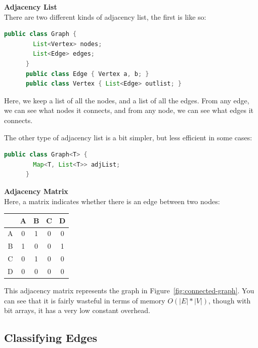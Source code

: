 \begin{description}
  \item \textbf{Adjacency List}\\
    There are two different kinds of adjacency list, the first is like so:

    \begin{lstlisting}[language=java]
      public class Graph {
        List<Vertex> nodes;
        List<Edge> edges;
      }
      public class Edge { Vertex a, b; }
      public class Vertex { List<Edge> outlist; }
    \end{lstlisting}

    Here, we keep a list of all the nodes, and a list of all the edges. From
    any edge, we can see what nodes it connects, and from any node, we can
    see what edges it connects.

    The other type of adjacency list is a bit simpler, but less efficient in
    some cases:

    \begin{lstlisting}[language=java]
      public class Graph<T> {
        Map<T, List<T>> adjList;
      }
    \end{lstlisting}
  \item \textbf{Adjacency Matrix}\\
    Here, a matrix indicates whether there is an edge between two nodes:

    \begin{center}
      \begin{tabular}{c|c c c c}
          & A & B & C & D\\ \hline
        A & 0 & 1 & 0 & 0\\
        B & 1 & 0 & 0 & 1\\
        C & 0 & 1 & 0 & 0\\
        D & 0 & 0 & 0 & 0\\
      \end{tabular}
    \end{center}

    This adjacency matrix represents the graph in
    Figure~\ref{fig:connected-graph}. You can see that it is fairly wasteful
    in terms of memory $O(|E|* |V|)$, though with bit arrays, it has a very 
    low constant overhead.
\end{description}

\subsection{Classifying Edges}


